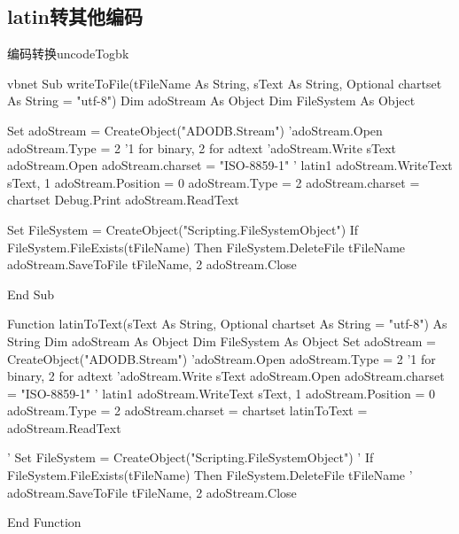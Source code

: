 \subsection{latin转其他编码}
\begin{codebox}{编码转换}{uncodeTogbk}
	\begin{amzcode}{vbnet}
		Sub writeToFile(tFileName As String, sText As String, Optional chartset As String = "utf-8")
			Dim adoStream As Object
			Dim FileSystem As Object
			
			Set adoStream = CreateObject("ADODB.Stream")
			'adoStream.Open
			adoStream.Type = 2 '1 for binary, 2 for adtext
			'adoStream.Write sText
			adoStream.Open
			adoStream.charset = "ISO-8859-1" ' latin1
			adoStream.WriteText sText, 1
			adoStream.Position = 0
			adoStream.Type = 2
			adoStream.charset = chartset
			Debug.Print adoStream.ReadText
			
			Set FileSystem = CreateObject("Scripting.FileSystemObject")
			If FileSystem.FileExists(tFileName) Then FileSystem.DeleteFile tFileName
			adoStream.SaveToFile tFileName, 2
			adoStream.Close
		
		End Sub
		
		Function latinToText(sText As String, Optional chartset As String = "utf-8") As String
			Dim adoStream As Object
			Dim FileSystem As Object
			Set adoStream = CreateObject("ADODB.Stream")
			'adoStream.Open
			adoStream.Type = 2 '1 for binary, 2 for adtext
			'adoStream.Write sText
			adoStream.Open
			adoStream.charset = "ISO-8859-1" ' latin1
			adoStream.WriteText sText, 1
			adoStream.Position = 0
			adoStream.Type = 2
			adoStream.charset = chartset
			latinToText = adoStream.ReadText
			
			'    Set FileSystem = CreateObject("Scripting.FileSystemObject")
			'    If FileSystem.FileExists(tFileName) Then FileSystem.DeleteFile tFileName
			'    adoStream.SaveToFile tFileName, 2
			adoStream.Close
		
		End Function
	\end{amzcode}
\end{codebox}